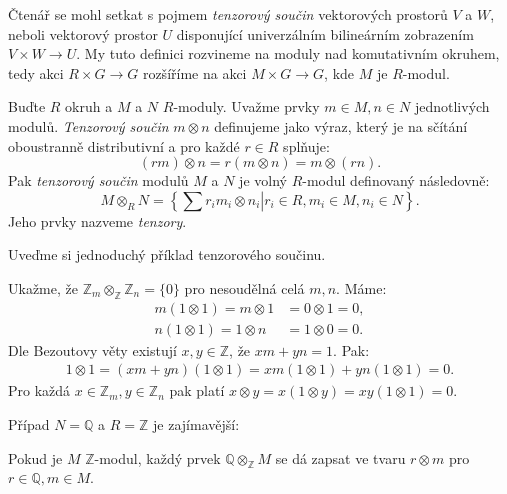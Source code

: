 \documentclass[12pt]{report}
\begin{document}
Čtenář se mohl setkat s pojmem \textit{tenzorový součin} vektorových prostorů $V$ a $W$, neboli vektorový prostor $U$ disponující univerzálním bilineárním zobrazením $V \times W \longrightarrow U$. My tuto definici rozvineme na moduly nad komutativním okruhem, tedy akci $R \times G \longrightarrow G$ rozšíříme na akci $M \times G \longrightarrow G$, kde $M$ je $R$-modul.

\begin{definice}
Buďte $R$ okruh a $M$ a $N$ $R$-moduly. Uvažme prvky $m \in M,n \in N$ jednotlivých modulů. \textit{Tenzorový součin} $m \otimes n$ definujeme jako výraz, který je na sčítání oboustranně distributivní a pro každé $r \in R$ splňuje:
\begin{equation*}
(rm) \otimes n = r (m \otimes n) = m \otimes (rn).
\end{equation*}
Pak \textit{tenzorový součin} modulů $M$ a $N$ je volný $R$-modul definovaný následovně:
\begin{equation*}
M  \otimes_R N = \left \lbrace \left. \sum r_i m_i \otimes n_i \right\vert r_i \in R, m_i \in M, n_i \in N \right \rbrace.
\end{equation*} 
Jeho prvky nazveme \textit{tenzory}.
\end{definice}

Uveďme si jednoduchý příklad tenzorového součinu. 

\begin{priklad}
Ukažme, že $\mathbb{Z}_m \otimes_{\mathbb{Z}} \mathbb{Z}_n = \lbrace 0 \rbrace$ pro nesoudělná celá $m,n$. Máme:
\begin{align*}
m (1 \otimes 1) = m \otimes 1  &= 0 \otimes 1 = 0,\\
n (1 \otimes 1) = 1 \otimes n &= 1 \otimes 0 = 0.
\end{align*}
Dle Bezoutovy věty existují $x,y \in \mathbb{Z}$, že $xm + yn = 1$. Pak:
\begin{align*}
1 \otimes 1 = (xm+yn)(1 \otimes 1) = xm (1 \otimes 1) + yn (1 \otimes 1) = 0.
\end{align*}
Pro každá $x \in \mathbb{Z}_m, y \in \mathbb{Z}_n$ pak platí $x \otimes y = x(1 \otimes y) = xy (1 \otimes 1)  = 0$.
\end{priklad}

Případ $N = \mathbb{Q}$ a $R = \mathbb{Z}$ je zajímavější:

\begin{veta}\label{qtensor}
Pokud je $M$ $\mathbb{Z}$-modul, každý prvek $\mathbb{Q} \otimes_{\mathbb{Z}} M$ se dá zapsat ve tvaru $r \otimes m$ pro $r \in \mathbb{Q}, m \in M$.
\end{veta}
\end{document}
